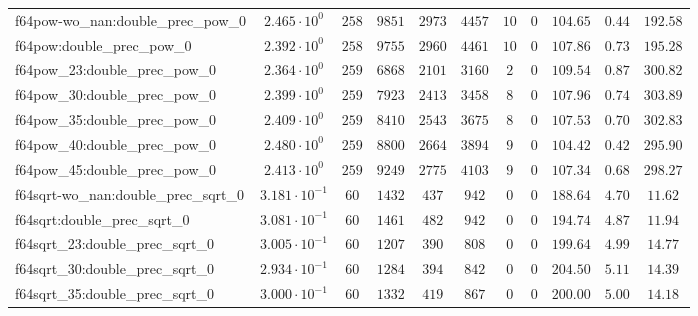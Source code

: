 \begin{tabular}{|l|c|c|c|c|c|c|c|c|c|c|}
f64pow-wo\_nan:double\_prec\_pow\_0            & $ 2.465 \cdot 10^{0}  $ & $ 258    $ & $ 9851   $ & $ 2973  $ & $ 4457  $ & $ 10  $ & $ 0 $ & $ 104.65      $ & $ 0.44    $ & $ 192.58  $ \\
f64pow:double\_prec\_pow\_0                    & $ 2.392 \cdot 10^{0}  $ & $ 258    $ & $ 9755   $ & $ 2960  $ & $ 4461  $ & $ 10  $ & $ 0 $ & $ 107.86      $ & $ 0.73    $ & $ 195.28  $ \\
f64pow\_23:double\_prec\_pow\_0                & $ 2.364 \cdot 10^{0}  $ & $ 259    $ & $ 6868   $ & $ 2101  $ & $ 3160  $ & $ 2   $ & $ 0 $ & $ 109.54      $ & $ 0.87    $ & $ 300.82  $ \\
f64pow\_30:double\_prec\_pow\_0                & $ 2.399 \cdot 10^{0}  $ & $ 259    $ & $ 7923   $ & $ 2413  $ & $ 3458  $ & $ 8   $ & $ 0 $ & $ 107.96      $ & $ 0.74    $ & $ 303.89  $ \\
f64pow\_35:double\_prec\_pow\_0                & $ 2.409 \cdot 10^{0}  $ & $ 259    $ & $ 8410   $ & $ 2543  $ & $ 3675  $ & $ 8   $ & $ 0 $ & $ 107.53      $ & $ 0.70    $ & $ 302.83  $ \\
f64pow\_40:double\_prec\_pow\_0                & $ 2.480 \cdot 10^{0}  $ & $ 259    $ & $ 8800   $ & $ 2664  $ & $ 3894  $ & $ 9   $ & $ 0 $ & $ 104.42      $ & $ 0.42    $ & $ 295.90  $ \\
f64pow\_45:double\_prec\_pow\_0                & $ 2.413 \cdot 10^{0}  $ & $ 259    $ & $ 9249   $ & $ 2775  $ & $ 4103  $ & $ 9   $ & $ 0 $ & $ 107.34      $ & $ 0.68    $ & $ 298.27  $ \\
f64sqrt-wo\_nan:double\_prec\_sqrt\_0          & $ 3.181 \cdot 10^{-1} $ & $ 60     $ & $ 1432   $ & $ 437   $ & $ 942   $ & $ 0   $ & $ 0 $ & $ 188.64      $ & $ 4.70    $ & $ 11.62   $ \\
f64sqrt:double\_prec\_sqrt\_0                  & $ 3.081 \cdot 10^{-1} $ & $ 60     $ & $ 1461   $ & $ 482   $ & $ 942   $ & $ 0   $ & $ 0 $ & $ 194.74      $ & $ 4.87    $ & $ 11.94   $ \\
f64sqrt\_23:double\_prec\_sqrt\_0              & $ 3.005 \cdot 10^{-1} $ & $ 60     $ & $ 1207   $ & $ 390   $ & $ 808   $ & $ 0   $ & $ 0 $ & $ 199.64      $ & $ 4.99    $ & $ 14.77   $ \\
f64sqrt\_30:double\_prec\_sqrt\_0              & $ 2.934 \cdot 10^{-1} $ & $ 60     $ & $ 1284   $ & $ 394   $ & $ 842   $ & $ 0   $ & $ 0 $ & $ 204.50      $ & $ 5.11    $ & $ 14.39   $ \\
f64sqrt\_35:double\_prec\_sqrt\_0              & $ 3.000 \cdot 10^{-1} $ & $ 60     $ & $ 1332   $ & $ 419   $ & $ 867   $ & $ 0   $ & $ 0 $ & $ 200.00      $ & $ 5.00    $ & $ 14.18   $ \\

\end{tabular}

